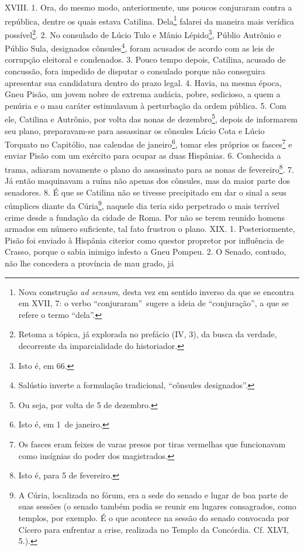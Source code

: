 XVIII. 1. Ora, do mesmo modo, anteriormente, uns poucos conjuraram contra a república, dentre os quais estava Catilina. Dela\footnote{Nova construção \emph{ad
sensum}, desta vez em sentido inverso da que se encontra em XVII, 7: o verbo
``conjuraram''\ sugere a ideia de ``conjuração'', a que se refere o termo
``dela''.} falarei da maneira mais verídica possível\footnote{Retoma a tópica,
já explorada no prefácio (IV, 3), da busca da verdade, decorrente da
imparcialidade do historiador.}. 2. No consulado de Lúcio Tulo e Mânio
Lépido\footnote{Isto é, em 66.}, Públio Autrônio e Públio Sula, designados
cônsules\footnote{Salústio inverte a formulação tradicional, ``cônsules
designados''.}, foram acusados de acordo com as leis de corrupção eleitoral e
condenados. 3. Pouco tempo depois, Catilina, acusado de concussão, fora
impedido de disputar o consulado porque não conseguira apresentar sua
candidatura dentro do prazo legal. 4. Havia, na mesma época, Gneu Pisão, um
jovem nobre de extrema audácia, pobre, sedicioso, a quem a penúria e o mau
caráter estimulavam à perturbação da ordem pública. 5. Com ele, Catilina e
Autrônio, por volta das nonas de dezembro\footnote{Ou seja, por volta de 5 de
dezembro.}, depois de informarem seu plano, preparavam-se para assassinar os
cônsules Lúcio Cota e Lúcio Torquato no Capitólio, nas calendas de
janeiro\footnote{Isto é, em 1\oi\ de janeiro.}, tomar eles próprios os
fasces\footnote{Os fasces eram feixes de varas presos por tiras vermelhas que
funcionavam como insígnias do poder dos magistrados.} e enviar Pisão com um
exército para ocupar as duas Hispânias. 6. Conhecida a trama, adiaram novamente
o plano do assassinato para as nonas de fevereiro\footnote{Isto é, para 5 de
fevereiro.}. 7. Já então maquinavam a ruína não apenas dos cônsules, mas da
maior parte dos senadores. 8. É que se Catilina não se tivesse precipitado em
dar o sinal a seus cúmplices diante da Cúria\footnote{A Cúria, localizada no
fórum, era a sede do senado e lugar de boa parte de suas sessões (o senado
também podia se reunir em lugares consagrados, como templos, por exemplo. É o
que acontece na sessão do senado convocada por Cícero para enfrentar a crise,
realizada no Templo da Concórdia. Cf. XLVI, 5.).}, naquele dia teria sido
perpetrado o mais terrível crime desde a fundação da cidade de Roma. Por não se
terem reunido homens armados em número suficiente, tal fato frustrou o plano.
XIX. 1. Posteriormente, Pisão foi enviado à Hispânia citerior como questor
propretor por influência de Crasso, porque o sabia inimigo infesto a Gneu
Pompeu. 2. O Senado, contudo, não lhe concedera a província de mau grado, já
